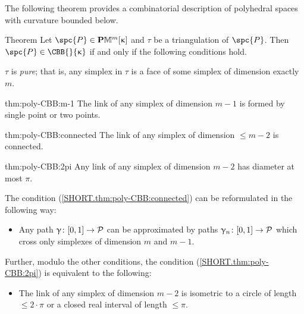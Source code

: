 
The following theorem provides a combinatorial description of polyhedral spaces with curvature bounded below.

\begin{thm}{Theorem}\label{thm:poly-CBB} Let $\spc{P}\in\PM{m}\kappa$ and $\tau$ be a triangulation of $\spc{P}$.
Then $\spc{P}\in\CBB{}{\kappa}$ if and only if the following conditions hold.

\begin{subthm}{} $\tau$ is \emph{pure}; 
that is, any simplex in $\tau$ is  a face of some simplex of dimension exactly $m$. 
\end{subthm}

\begin{subthm}{thm:poly-CBB:m-1}
The link of any simplex of dimension $m-1$ is formed by single point or two points.
\end{subthm}

\begin{subthm}{thm:poly-CBB:connected}
The link of any simplex of dimension $\le m-2$ is connected.
\end{subthm}

\begin{subthm}{thm:poly-CBB:2pi}
Any link of any simplex of dimension $m-2$
has diameter at most $\pi$.
\end{subthm}
\end{thm}

The condition (\ref{SHORT.thm:poly-CBB:connected})
can be reformulated in the following way:

\begin{itemize}
 \item[{\it \ref{SHORT.thm:poly-CBB:connected}$\,'\!$)}] 
Any path $\gamma\:[0,1]\to \spc{P}$ can be approximated by paths
$\gamma_n\:[0,1]\to \spc{P}$ 
which  cross only simplexes of dimension $m$ and $m-1$.
\end{itemize}

Further, modulo the other conditions,
the condition (\ref{SHORT.thm:poly-CBB:2pi})
is equivalent to the following:


\begin{itemize}
 \item[{\it \ref{SHORT.thm:poly-CBB:2pi}$\,'\!$)}] 
The link of any simplex of dimension $m-2$ is 
isometric to a circle of length $\le 2\cdot\pi$
or a closed real interval of length $\le \pi$.
\end{itemize}

